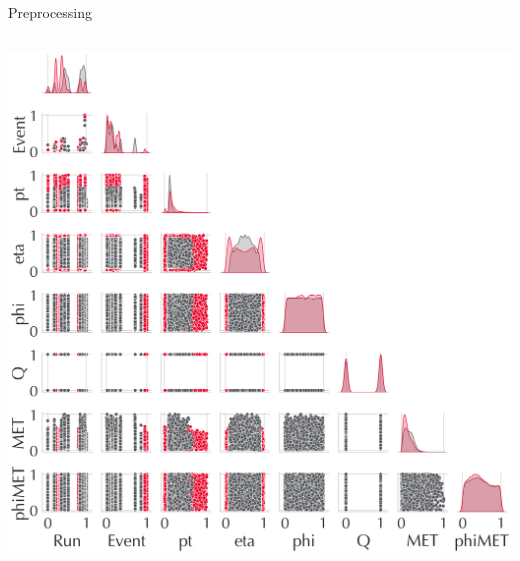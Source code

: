\documentclass{beamer}
\begin{document}
\begin{frame}{Preprocessing}
\begin{columns}[b]
      \includegraphics[width=\linewidth]{./Images/Wpairplot_scaled.png}
    \end{columns}%



\end{frame}
\end{document}
